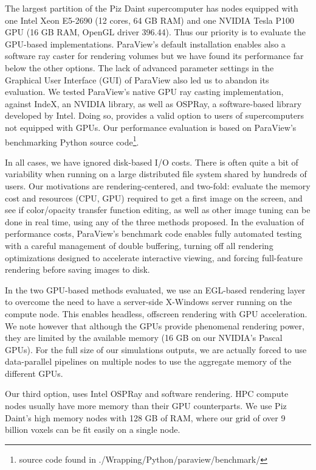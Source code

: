 \documentclass[5p,times]{elsarticle}
\begin{document}
The largest partition of the Piz Daint supercomputer has nodes equipped
with one Intel Xeon E5-2690 (12 cores, 64 GB RAM) and one NVIDIA
Tesla P100 GPU (16 GB RAM, OpenGL driver 396.44). Thus our priority is to evaluate
the GPU-based implementations.
ParaView's default installation enables also a software ray caster for rendering volumes but we have found its performance far
below the other options. The lack of advanced parameter settings in the Graphical
User Interface (GUI) of ParaView also led us to abandon its evaluation. We tested ParaView's native GPU
ray casting implementation, against IndeX, an NVIDIA library, as well as OSPRay, a software-based library developed by Intel.
Doing so, provides a valid option to users of supercomputers not equipped with GPUs.
Our performance evaluation is based on ParaView's benchmarking Python source
code\footnote{source code found in ./Wrapping/Python/paraview/benchmark/}.

In all cases, we have ignored disk-based I/O costs. There is often quite
a bit of variability when running on a large distributed file system shared by
hundreds of users. Our motivations are rendering-centered, and two-fold:
evaluate the memory cost and resources (CPU, GPU) required to get a first image
on the screen, and see if color/opacity transfer
function editing, as well as other image tuning can be done in real time, using
any of the three methods proposed. In the evaluation of performance costs, ParaView's
benchmark code enables fully automated testing with a careful management of
double buffering, turning off all rendering optimizations designed to accelerate
interactive viewing, and forcing full-feature rendering before saving images to disk.

In the two GPU-based methods evaluated, we use an EGL-based rendering layer \cite{EGL} to
overcome the need to have a server-side X-Windows server running on the compute node.
This enables headless, offscreen rendering with GPU acceleration. We note however that although
the GPUs provide phenomenal rendering power, they are limited by the available memory
(16 GB on our NVIDIA's Pascal GPUs). For the full size of our simulations outputs,
we are actually forced to use data-parallel pipelines on multiple nodes to use
the aggregate memory of the different GPUs.

Our third option, uses Intel OSPRay and software rendering. HPC compute nodes usually
have more memory than their GPU counterparts. We use Piz Daint's high memory nodes
with 128 GB of RAM, where our \textcolor{black}{grid} of over 9 billion voxels can be fit
easily on a single node.
\end{document}
